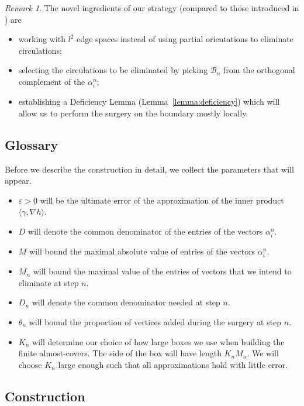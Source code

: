 \documentclass[10pt]{article}
\theoremstyle{plain}
\theoremstyle{remark}
\newtheorem{remark}[lemma]{Remark}
\newcommand{\1}{\mathbbm{1}}
\numberwithin{equation}{section}
\begin{document}
\begin{remark}
The novel ingredients of our strategy (compared to those introduced in \cite{kun2021measurable}) are 
\begin{itemize}
    \item working with $l^2$ edge spaces instead of using partial orientations to eliminate circulations;
    \item selecting the circulations to be eliminated by picking $\mathcal{B}_n$ from the orthogonal complement of the $\alpha_i^n$;
    \item establishing a Deficiency Lemma (Lemma~\ref{lemma:deficiency}) which will allow us to perform the surgery on the boundary mostly locally.
\end{itemize}
\end{remark}

\subsection{Glossary} \label{subsec:glossary}
Before we describe the construction in detail, we collect the parameters that will appear.

\begin{itemize}
    \item $\varepsilon >0$ will be the ultimate error of the approximation of the inner product $\langle \gamma, \nabla h\rangle$.
    \item $D$ will denote the common denominator of the entries of the  vectors $\alpha^n_i$.
    \item $M$ will bound the maximal absolute value of entries of the vectors $\alpha^n_i$.
    \item $M_n$ will bound the maximal value of the entries of vectors that we intend to eliminate at step $n$.
    \item $D_n$ will denote the common denominator needed at step $n$. 
    \item $\theta_n$ will bound the proportion of vertices added during the surgery at step $n$.
    \item $K_n$ will determine our choice of how large boxes we use when building the finite almost-covers. The side of the box will have length $K_n M_n$. We will choose $K_n$ large enough such that all approximations hold with little error.
\end{itemize}

\subsection{Construction} \label{subsec:construction}
\end{document}
